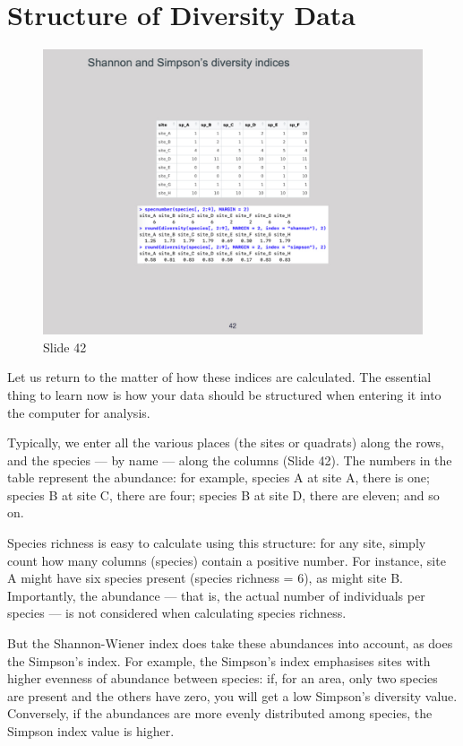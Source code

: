 \documentclass[
  10pt,
]{book}
\begin{document}
\section{Structure of Diversity Data}\label{structure-of-diversity-data}

\begin{figure}[ht]
\centering
\includegraphics[width=0.8\linewidth]{../images/BDC334/BDC334-042.jpeg}
\caption*{Slide 42}
\end{figure}

Let us return to the matter of how these indices are calculated. The
essential thing to learn now is how your data should be structured when
entering it into the computer for analysis.

Typically, we enter all the various places (the sites or quadrats) along
the rows, and the species --- by name --- along the columns (Slide 42).
The numbers in the table represent the abundance: for example, species A
at site A, there is one; species B at site C, there are four; species B
at site D, there are eleven; and so on.

Species richness is easy to calculate using this structure: for any
site, simply count how many columns (species) contain a positive number.
For instance, site A might have six species present (species richness =
\(6\)), as might site B. Importantly, the abundance --- that is, the
actual number of individuals per species --- is not considered when
calculating species richness.

But the Shannon-Wiener index does take these abundances into account, as
does the Simpson's index. For example, the Simpson's index emphasises
sites with higher evenness of abundance between species: if, for an
area, only two species are present and the others have zero, you will
get a low Simpson's diversity value. Conversely, if the abundances are
more evenly distributed among species, the Simpson index value is
higher.
\end{document}
